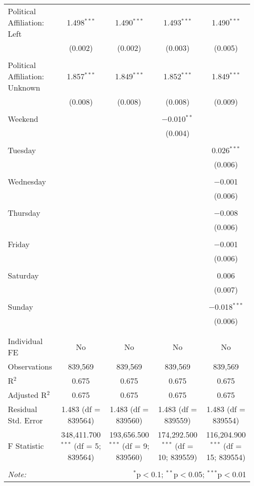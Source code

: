 \documentclass[
]{article}
\begin{document}
\begin{table}[!htbp]
{\begin{tabular}{@{\extracolsep{5pt}}lcccc}
 Political Affiliation: Left & 1.498$^{***}$ & 1.490$^{***}$ & 1.493$^{***}$ & 1.490$^{***}$ \\ 
  & (0.002) & (0.002) & (0.003) & (0.005) \\ 
  & & & & \\ 
 Political Affiliation: Unknown & 1.857$^{***}$ & 1.849$^{***}$ & 1.852$^{***}$ & 1.849$^{***}$ \\ 
  & (0.008) & (0.008) & (0.008) & (0.009) \\ 
  & & & & \\ 
 Weekend &  &  & $-$0.010$^{**}$ &  \\ 
  &  &  & (0.004) &  \\ 
  & & & & \\ 
 Tuesday &  &  &  & 0.026$^{***}$ \\ 
  &  &  &  & (0.006) \\ 
  & & & & \\ 
 Wednesday &  &  &  & $-$0.001 \\ 
  &  &  &  & (0.006) \\ 
  & & & & \\ 
 Thursday &  &  &  & $-$0.008 \\ 
  &  &  &  & (0.006) \\ 
  & & & & \\ 
 Friday &  &  &  & $-$0.001 \\ 
  &  &  &  & (0.006) \\ 
  & & & & \\ 
 Saturday &  &  &  & 0.006 \\ 
  &  &  &  & (0.007) \\ 
  & & & & \\ 
 Sunday &  &  &  & $-$0.018$^{***}$ \\ 
  &  &  &  & (0.006) \\ 
  & & & & \\ 
\hline \\[-1.8ex] 
Individual FE & No & No & No & No \\ 
Observations & 839,569 & 839,569 & 839,569 & 839,569 \\ 
R$^{2}$ & 0.675 & 0.675 & 0.675 & 0.675 \\ 
Adjusted R$^{2}$ & 0.675 & 0.675 & 0.675 & 0.675 \\ 
Residual Std. Error & 1.483 (df = 839564) & 1.483 (df = 839560) & 1.483 (df = 839559) & 1.483 (df = 839554) \\ 
F Statistic & 348,411.700$^{***}$ (df = 5; 839564) & 193,656.500$^{***}$ (df = 9; 839560) & 174,292.500$^{***}$ (df = 10; 839559) & 116,204.900$^{***}$ (df = 15; 839554) \\ 
\hline 
\hline \\[-1.8ex] 
\textit{Note:}  & \multicolumn{4}{r}{$^{*}$p$<$0.1; $^{**}$p$<$0.05; $^{***}$p$<$0.01} \\ 
\end{tabular}
} 
\end{table} 
\newpage
\end{document}
